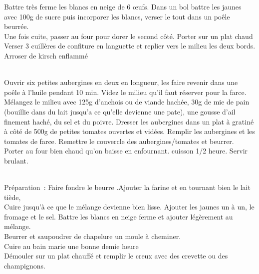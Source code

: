 \begin{minipage}[c]{\textwidth}
Battre très ferme les blancs en neige de 6 œufs. Dans un bol battre les jaunes avec 100g de sucre puis incorporer les blancs, verser le tout dans un poêle beurrée.\\
Une fois cuite, passer au four pour dorer le second côté. Porter sur un plat chaud\\
Verser 3 cuillères de confiture en languette et replier vers le milieu les deux bords.\\
Arroser de kirsch enflammé\\
\\

\end{minipage}

\begin{minipage}[c]{\textwidth}
Ouvrir six petites aubergines en deux en longueur, les faire revenir dans une poêle à l'huile pendant 10 min. Videz le milieu qu'il faut réserver pour la farce.\\
Mélangez le milieu avec 125g d’anchois ou de viande hachée, 30g de mie de pain (bouillie dans du lait jusqu'a ce qu'elle devienne une pate), une gousse d’ail finement haché, du sel et du poivre. Dresser les aubergines dans un plat à gratiné à côté de 500g de petites tomates ouvertes et vidées. Remplir les aubergines et les tomates de farce. Remettre le couvercle des aubergines/tomates et beurrer. Porter au four bien chaud qu'on baisse en enfournant. cuisson 1/2 heure. Servir brulant.\\
\\

\end{minipage}

\begin{minipage}[c]{\textwidth}
Préparation : Faire fondre le beurre .Ajouter la farine et en tournant bien le lait tiède,\\
Cuire jusqu’à ce que le mélange devienne bien lisse. Ajouter les jaunes un à un, le fromage et le sel. Battre les blancs en neige ferme et ajouter légèrement au mélange.\\
Beurrer et saupoudrer de chapelure un moule à cheminer.\\
Cuire au bain marie une bonne demie heure\\
Démouler sur un plat chauffé et remplir le creux avec des crevette ou des champignons.\\
\\

\end{minipage}

